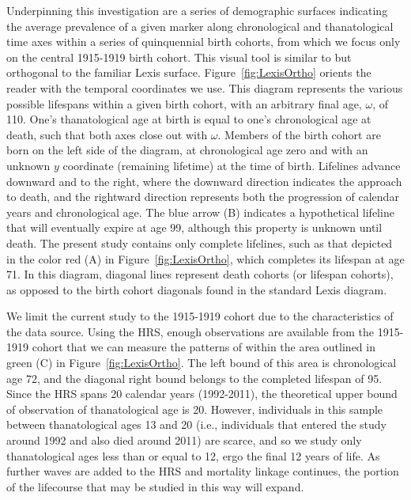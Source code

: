\documentclass[11pt,oneside]{article} %
\begin{document}
Underpinning this investigation are a series of demographic surfaces indicating
the average prevalence of a given marker along chronological and
thanatological time axes within a series of quinquennial birth cohorts, from
which we focus only on the central 1915-1919 birth cohort.
This visual tool is similar to but orthogonal to the familiar Lexis surface.
Figure~\ref{fig:LexisOrtho} orients the reader with the temporal coordinates we
use. This diagram represents the various possible lifespans within a given birth cohort, with an arbitrary final age, $\omega$, of 110. One's
thanatological age at birth is equal to one's chronological age at death, such
that both axes close out with $\omega$. Members of the birth cohort are born on
the left side of the diagram, at chronological age zero and with an unknown $y$ coordinate (remaining lifetime) at the time of birth.
Lifelines advance downward and to the right, where the downward direction indicates the approach to death, and the
rightward direction represents both the progression of calendar years and
chronological age. The blue arrow (B) indicates a hypothetical lifeline that
will eventually expire at age 99, although this property is unknown until death. The
present study contains only complete lifelines, such as that depicted in the
color red (A) in Figure~\ref{fig:LexisOrtho}, which completes its lifespan at
age 71. In this diagram, diagonal lines represent death cohorts (or lifespan
cohorts), as opposed to the birth cohort diagonals found in the standard Lexis
diagram.

We limit the current study to the 1915-1919 cohort due
to the characteristics of the data source. Using the HRS, enough
observations are available from the 1915-1919 cohort that we can measure
the patterns of within the area outlined in green (C) in Figure~\ref{fig:LexisOrtho}. The
left bound of this area is chronological age 72, and the diagonal right
bound belongs to the completed lifespan of 95. Since the HRS spans 20 calendar years (1992-2011), the
theoretical upper bound of observation of thanatological age is 20.
However, individuals in this sample between
thanatological ages 13 and 20 (i.e., individuals that
entered the study around 1992 and also died around 2011) are scarce,
and so we study only thanatological ages less than or equal to 12, ergo the
final 12 years of life. As further waves are added to the HRS and mortality
linkage continues, the portion of the lifecourse that may be studied in this way
will expand.
\end{document}
